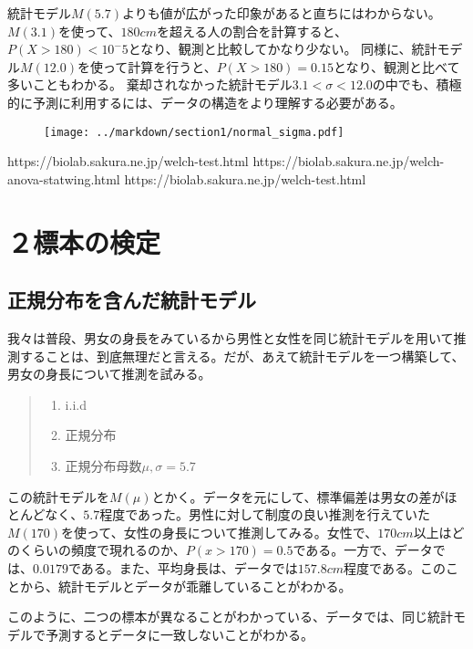 \documentclass[a4paper,11pt,dvipdfmx]{jsarticle}
\begin{document}
統計モデル$M(5.7)$よりも値が広がった印象があると直ちにはわからない。
$M(3.1)$を使って、$180cm$を超える人の割合を計算すると、$P(X>180)<10^-5$となり、観測と比較してかなり少ない。
同様に、統計モデル$M(12.0)$を使って計算を行うと、$P(X>180)=0.15$となり、観測と比べて多いこともわかる。
棄却されなかった統計モデル$3.1<\sigma<12.0$の中でも、積極的に予測に利用するには、データの構造をより理解する必要がある。


\begin{figure}
\begin{center}
    \texttt{[image: ../markdown/section1/normal\_sigma.pdf]}
\end{center}
\end{figure}

https://biolab.sakura.ne.jp/welch-test.html
https://biolab.sakura.ne.jp/welch-anova-statwing.html
https://biolab.sakura.ne.jp/welch-test.html
\fi



\section{２標本の検定}
\subsection{正規分布を含んだ統計モデル}
我々は普段、男女の身長をみているから男性と女性を同じ統計モデルを用いて推測することは、到底無理だと言える。だが、あえて統計モデルを一つ構築して、男女の身長について推測を試みる。
\begin{quote}
    \begin{enumerate}[(1)]
\item i.i.d
\item 正規分布
\item 正規分布母数$\mu,\sigma=5.7$
\end{enumerate}
\end{quote}
この統計モデルを$M(\mu)$とかく。データを元にして、標準偏差は男女の差がほとんどなく、$5.7$程度であった。男性に対して制度の良い推測を行えていた$M(170)$を使って、女性の身長について推測してみる。女性で、$170cm$以上はどのくらいの頻度で現れるのか、$P(x>170)=0.5$である。一方で、データでは、$0.0179$である。また、平均身長は、データでは$157.8cm$程度である。このことから、統計モデルとデータが乖離していることがわかる。


このように、二つの標本が異なることがわかっている、データでは、同じ統計モデルで予測するとデータに一致しないことがわかる。
\fi
\end{document}
